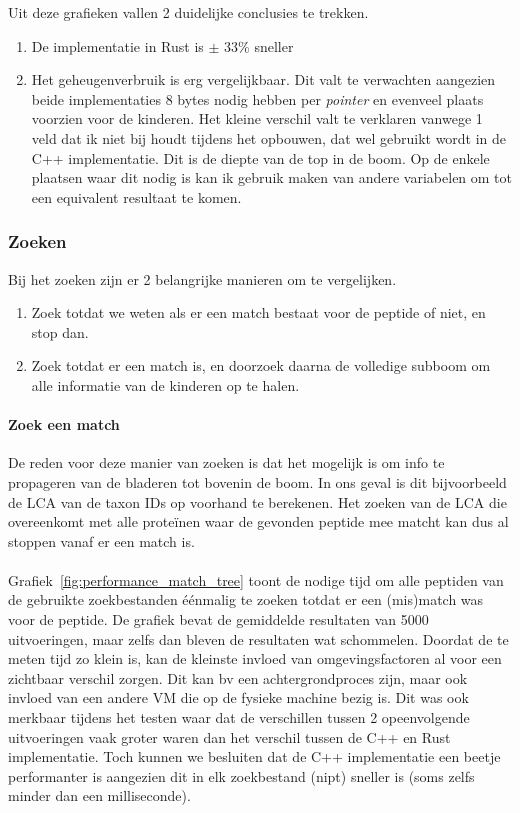 Uit deze grafieken vallen 2 duidelijke conclusies te trekken.
\begin{enumerate}
    \item De implementatie in Rust is $\pm$ 33\% sneller
    \item Het geheugenverbruik is erg vergelijkbaar.
    Dit valt te verwachten aangezien beide implementaties 8 bytes nodig hebben per \textit{pointer} en evenveel plaats voorzien voor de kinderen.
    Het kleine verschil valt te verklaren vanwege 1 veld dat ik niet bij houdt tijdens het opbouwen, dat wel gebruikt wordt in de C++ implementatie.
    Dit is de diepte van de top in de boom.
    Op de enkele plaatsen waar dit nodig is kan ik gebruik maken van andere variabelen om tot een equivalent resultaat te komen.
\end{enumerate}

\subsubsection{Zoeken}
Bij het zoeken zijn er 2 belangrijke manieren om te vergelijken.
\begin{enumerate}
    \item Zoek totdat we weten als er een match bestaat voor de peptide of niet, en stop dan.
    \item Zoek totdat er een match is, en doorzoek daarna de volledige subboom om alle informatie van de kinderen op te halen.

\end{enumerate}

\paragraph{Zoek een match}
De reden voor deze manier van zoeken is dat het mogelijk is om info te propageren van de bladeren tot bovenin de boom.
In ons geval is dit bijvoorbeeld de LCA van de taxon IDs op voorhand te berekenen.
Het zoeken van de LCA die overeenkomt met alle proteïnen waar de gevonden peptide mee matcht kan dus al stoppen vanaf er een match is.
\\ \\
Grafiek~\ref{fig:performance_match_tree} toont de nodige tijd om alle peptiden van de gebruikte zoekbestanden éénmalig te zoeken totdat er een (mis)match was voor de peptide.
De grafiek bevat de gemiddelde resultaten van 5000 uitvoeringen, maar zelfs dan bleven de resultaten wat schommelen.
Doordat de te meten tijd zo klein is, kan de kleinste invloed van omgevingsfactoren al voor een zichtbaar verschil zorgen.
Dit kan bv een achtergrondproces zijn, maar ook invloed van een andere VM die op de fysieke machine bezig is.
Dit was ook merkbaar tijdens het testen waar dat de verschillen tussen 2 opeenvolgende uitvoeringen vaak groter waren dan het verschil tussen de C++ en Rust implementatie.
Toch kunnen we besluiten dat de C++ implementatie een beetje performanter is aangezien dit in elk zoekbestand (nipt) sneller is (soms zelfs minder dan een milliseconde).

